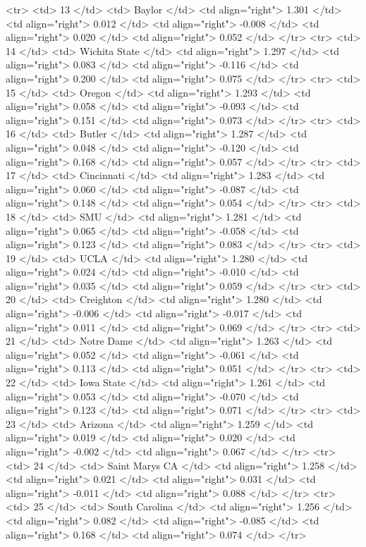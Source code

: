   <tr> <td> 13 </td> <td> Baylor </td> <td align="right"> 1.301 </td> <td align="right"> 0.012 </td> <td align="right"> -0.008 </td> <td align="right"> 0.020 </td> <td align="right"> 0.052 </td> </tr>
  <tr> <td> 14 </td> <td> Wichita State </td> <td align="right"> 1.297 </td> <td align="right"> 0.083 </td> <td align="right"> -0.116 </td> <td align="right"> 0.200 </td> <td align="right"> 0.075 </td> </tr>
  <tr> <td> 15 </td> <td> Oregon </td> <td align="right"> 1.293 </td> <td align="right"> 0.058 </td> <td align="right"> -0.093 </td> <td align="right"> 0.151 </td> <td align="right"> 0.073 </td> </tr>
  <tr> <td> 16 </td> <td> Butler </td> <td align="right"> 1.287 </td> <td align="right"> 0.048 </td> <td align="right"> -0.120 </td> <td align="right"> 0.168 </td> <td align="right"> 0.057 </td> </tr>
  <tr> <td> 17 </td> <td> Cincinnati </td> <td align="right"> 1.283 </td> <td align="right"> 0.060 </td> <td align="right"> -0.087 </td> <td align="right"> 0.148 </td> <td align="right"> 0.054 </td> </tr>
  <tr> <td> 18 </td> <td> SMU </td> <td align="right"> 1.281 </td> <td align="right"> 0.065 </td> <td align="right"> -0.058 </td> <td align="right"> 0.123 </td> <td align="right"> 0.083 </td> </tr>
  <tr> <td> 19 </td> <td> UCLA </td> <td align="right"> 1.280 </td> <td align="right"> 0.024 </td> <td align="right"> -0.010 </td> <td align="right"> 0.035 </td> <td align="right"> 0.059 </td> </tr>
  <tr> <td> 20 </td> <td> Creighton </td> <td align="right"> 1.280 </td> <td align="right"> -0.006 </td> <td align="right"> -0.017 </td> <td align="right"> 0.011 </td> <td align="right"> 0.069 </td> </tr>
  <tr> <td> 21 </td> <td> Notre Dame </td> <td align="right"> 1.263 </td> <td align="right"> 0.052 </td> <td align="right"> -0.061 </td> <td align="right"> 0.113 </td> <td align="right"> 0.051 </td> </tr>
  <tr> <td> 22 </td> <td> Iowa State </td> <td align="right"> 1.261 </td> <td align="right"> 0.053 </td> <td align="right"> -0.070 </td> <td align="right"> 0.123 </td> <td align="right"> 0.071 </td> </tr>
  <tr> <td> 23 </td> <td> Arizona </td> <td align="right"> 1.259 </td> <td align="right"> 0.019 </td> <td align="right"> 0.020 </td> <td align="right"> -0.002 </td> <td align="right"> 0.067 </td> </tr>
  <tr> <td> 24 </td> <td> Saint Marys CA </td> <td align="right"> 1.258 </td> <td align="right"> 0.021 </td> <td align="right"> 0.031 </td> <td align="right"> -0.011 </td> <td align="right"> 0.088 </td> </tr>
  <tr> <td> 25 </td> <td> South Carolina </td> <td align="right"> 1.256 </td> <td align="right"> 0.082 </td> <td align="right"> -0.085 </td> <td align="right"> 0.168 </td> <td align="right"> 0.074 </td> </tr>
